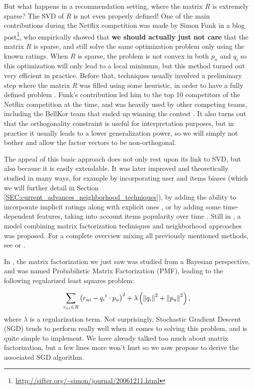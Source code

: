 But what happens in a recommendation setting, where the matrix $R$ is extremely
sparse? The SVD of $R$ is not even properly defined! One of the main
contributions during the Netflix competition was made by Simon Funk in a blog
post\footnote{\url{http://sifter.org/~simon/journal/20061211.html}}, who empirically
showed that \textbf{we should actually just not care} that the matrix $R$ is
sparse, and still solve the same optimization problem only using the known
ratings.  When $R$ is sparse, the problem is not convex in both $p_u$ and $q_i$
so this optimization will only lead to a local minimum, but this method turned
out very efficient in practice. Before that, techniques usually involved  a
preliminary step where the matrix $R$ was filled using some heuristic, in order
to have a fully defined problem \cite{SarKarKonRie00}. Funk's contribution led
him to the top 10 competitors of the Netflix competition at the time, and was
heavily used by other competing teams, including the BellKor team that ended up
winning the contest \cite{Kor09}. It also turns out that the orthogonality
constraint is useful for interpretation purposes, but in practice it usually
leads to a lower generalization power, so we will simply not bother and allow
the factor vectors to be non-orthogonal.

The appeal of this basic approach does not only rest upon its link to SVD, but
also because it is easily extendable. It was later improved and theoretically
studied in many ways, for example by incorporating user and items biases
\cite{KorACM2010} (which we will further detail in Section
\ref{SEC:current_advances_neighborhood_techniques}), by adding the ability to
incorporate implicit ratings along with explicit ones \cite{Pat07, KorACM2010},
or by adding some time-dependent features, taking into account items popularity
over time \cite{Kor09}. Still in \cite{KorACM2010}, a model combining matrix
factorization techniques and neighborhood approaches was proposed. For a
complete overview mixing all previously mentioned methods, see \cite{KorBel11}
or \cite{KorBelVol09}.

In \cite{SalMni07}, the matrix factorization we just saw was studied from a Bayesian
perspective, and was named Probabilistic Matrix Factorization (PMF), leading to
the following regularized least squares problem:

$$
\sum_{r_{ui} \in R} \left(r_{ui} - {q_i}^t \cdot p_u \right)^2 +
\lambda\left({\left\lVert q_i\right\rVert}_{}^2 + {\left\lVert p_u\right\rVert}_{}^2\right),
$$
where $\lambda$ is a regularization term. Not surprisingly, Stochastic Gradient
Descent (SGD) tends to perform really well when it comes to solving this
problem, and is quite simple to implement.  We have already talked too much
about matrix factorization, but a few lines more won't hurt so we now propose
to derive the associated SGD algorithm.

